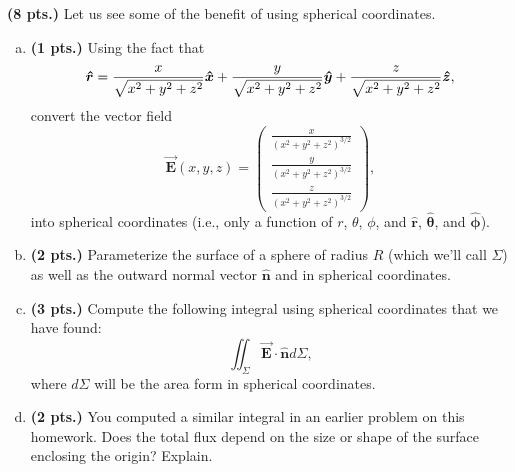 \documentclass[12pt]{article} %
\newcommand{\vecfieldE}{\boldsymbol{\vec{E}}}
\newcommand{\rhat}{\boldsymbol{\hat{r}}}
\newcommand{\thetahat}{\boldsymbol{\hat{\theta}}}
\newcommand{\phihat}{\boldsymbol{\hat{\phi}}}
\newcommand{\unitvec}{\boldsymbol{\hat{n}}}
\begin{document}
\newpage
\begin{problem}
	\textbf{(8 pts.)} Let us see some of the benefit of using spherical coordinates. 
	\begin{enumerate}[(a)]
		\item \textbf{(1 pts.)} Using the fact that 
		\[
		\rhat = \frac{x}{\sqrt{x^2+y^2+z^2}}\xhat + \frac{y}{\sqrt{x^2+y^2+z^2}}\yhat + \frac{z}{\sqrt{x^2+y^2+z^2}}\zhat,
		\]
		convert the vector field 
		\[
		\vecfieldE(x,y,z) = \begin{pmatrix} \frac{x}{(x^2+y^2+z^2)^{3/2}} \\ \frac{y}{(x^2+y^2+z^2)^{3/2}} \\ \frac{z}{(x^2+y^2+z^2)^{3/2}} \end{pmatrix},
		\] into spherical coordinates (i.e., only a function of $r$, $\theta$, $\phi$, and $\rhat$, $\thetahat$, and $\phihat$).
		\item \textbf{(2 pts.)} Parameterize the surface of a sphere of radius $R$ (which we'll call $\Sigma$) as well as the outward normal vector $\unitvec$ and  in spherical coordinates.
		\item \textbf{(3 pts.)} Compute the following integral using spherical coordinates that we have found:
		\[
		\iint_\Sigma \vecfieldE \cdot \unitvec d\Sigma,
		\]
		where $d\Sigma$ will be the area form in spherical coordinates.
		\item \textbf{(2 pts.)} You computed a similar integral in an earlier problem on this homework. Does the total flux depend on the size or shape of the surface enclosing the origin? Explain.
	\end{enumerate}
\end{problem}
\end{document}
